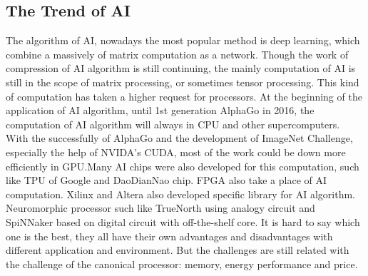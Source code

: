 \subsection{The Trend of AI}
The algorithm of AI, nowadays the most popular method is deep learning, which combine a massively of matrix computation as a network. Though the work of compression of AI algorithm is still continuing, the mainly computation of AI is still in the scope of matrix processing, or sometimes tensor processing. This kind of computation has taken a higher request for processors. 
At the beginning of the application of AI algorithm, until 1st generation AlphaGo\cite{silver2016mastering} in 2016, the computation of AI algorithm will always in CPU and other supercomputers. With the successfully of AlphaGo and the development of ImageNet Challenge\cite{dean2012large}, especially the help of NVIDA’s CUDA, most of the work could be down more efficiently in GPU\cite{ren2015faster}\cite{schmidhuber2015deep}.Many AI chips were also developed for this computation, such like TPU of Google\cite{jouppi2017datacenter}\cite{silver2017mastering} and DaoDianNao chip\cite{chen2014dadiannao}. FPGA also take a place of AI computation\cite{schmidhuber2015deep}\cite{zhang2015optimizing}. Xilinx and Altera also developed specific library for AI algorithm. Neuromorphic processor such like TrueNorth\cite{merolla2014million} using analogy circuit and SpiNNaker\cite{furber2014spinnaker} based on digital circuit with off-the-shelf core.
It is hard to say which one is the best, they all have their own advantages and disadvantages with different application and environment. But the challenges are still related with the challenge of the canonical processor: memory, energy performance and price.

